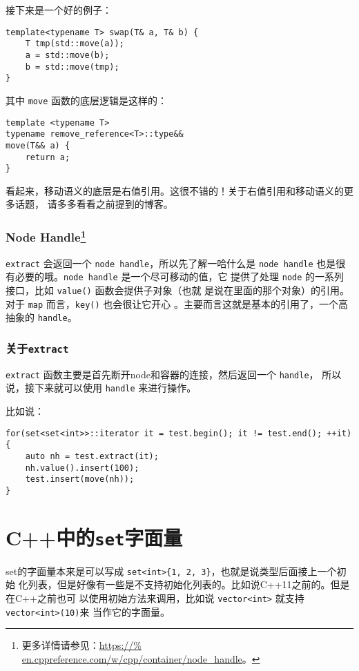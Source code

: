 接下来是一个好的例子：
\begin{lstlisting}
template<typename T> swap(T& a, T& b) {
    T tmp(std::move(a));
    a = std::move(b);
    b = std::move(tmp);
}
\end{lstlisting}

其中 \verb|move| 函数的底层逻辑是这样的：
\begin{lstlisting}
template <typename T>
typename remove_reference<T>::type&&
move(T&& a) {
    return a;
}
\end{lstlisting}

看起来，移动语义的底层是右值引用。这很不错的！关于右值引用和移动语义的更多话题，
请多多看看之前提到的博客。

\subsubsection[Node Handle]{Node Handle\footnote{更多详情请参见：\url{https://%
en.cppreference.com/w/cpp/container/node_handle}。}}

\verb|extract| 会返回一个 \verb|node handle|，所以先了解一哈什么是 
\verb|node handle| 也是很有必要的哦。\verb|node handle| 是一个尽可移动的值，它
提供了处理 \verb|node| 的一系列接口，比如 \verb|value()| 函数会提供子对象（也就
是说在里面的那个对象）的引用。对于 \verb|map| 而言，\verb|key()| 也会很让它开心
。主要而言这就是基本的引用了，一个高抽象的 \verb|handle|。

\subsubsection{关于{\tt extract}}

\verb|extract| 函数主要是首先断开node和容器的连接，然后返回一个 \verb|handle|，
所以说，接下来就可以使用 \verb|handle| 来进行操作。

比如说：
\begin{lstlisting}
for(set<set<int>>::iterator it = test.begin(); it != test.end(); ++it) {
    auto nh = test.extract(it);
    nh.value().insert(100);
    test.insert(move(nh));
}
\end{lstlisting}


\section{C++中的{\tt set}字面量}

set的字面量本来是可以写成 \verb|set<int>{1, 2, 3}|，也就是说类型后面接上一个初始
化列表，但是好像有一些是不支持初始化列表的。比如说C++11之前的。但是在C++之前也可
以使用初始方法来调用，比如说 \verb|vector<int>| 就支持 \verb|vector<int>(10)|来
当作它的字面量。


